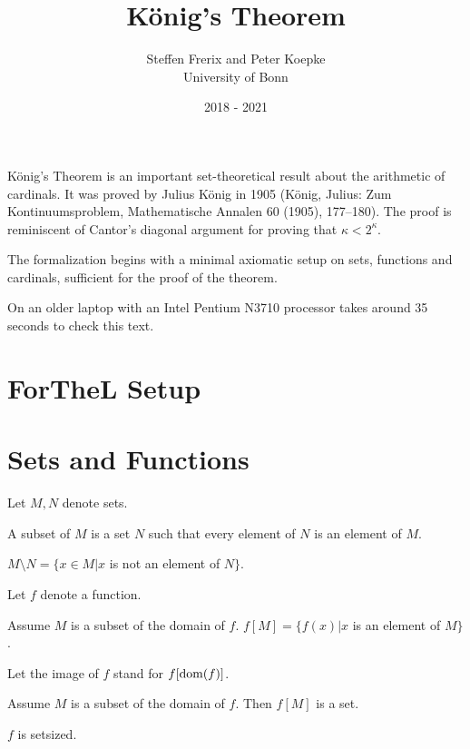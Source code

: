 \documentclass{article}
\title{König's Theorem}
\author{Steffen Frerix and Peter Koepke\\
University of Bonn}
\date{2018 - 2021}
\begin{document}
  \maketitle

König's Theorem is an important set-theoretical result about the
arithmetic of cardinals. It was proved by Julius König in 1905
(König, Julius: Zum Kontinuumsproblem, Mathematische Annalen 60 (1905), 177–180).
The proof is reminiscent of Cantor's diagonal argument for
proving that $\kappa < 2^\kappa$.

The formalization begins with a minimal axiomatic setup on sets, functions
and cardinals, sufficient for the proof of the theorem.

On an older laptop
with an Intel Pentium N3710 processor \Naproche takes
around 35 seconds to check this text.

\section{ForTheL Setup}

\begin{forthel}
\end{forthel}


\section{Sets and Functions}

\begin{forthel}
    Let $M,N$ denote sets.

    \begin{definition}
     A subset of $M$ is a set $N$ such that every element
     of $N$ is an element of $M$.
    \end{definition}

    \begin{definition}
      $M \setminus N = \{x \in M | x$ is not an element of $N\}$.
    \end{definition}

    Let $f$ denote a function.

    \begin{definition}
      Assume $M$ is a subset of the domain of $f$.
      $f[M] = \{f(x) | x$ is an element of $M\}$.
    \end{definition}

    Let the image of $f$ stand for $f[\operatorname{dom}(f)]$.

    \begin{axiom}
      Assume $M$ is a subset of the domain of $f$.
      Then $f[M]$ is a set.
    \end{axiom}

    \begin{axiom}
      $f$ is setsized.
    \end{axiom}
\end{forthel}
\end{document}

